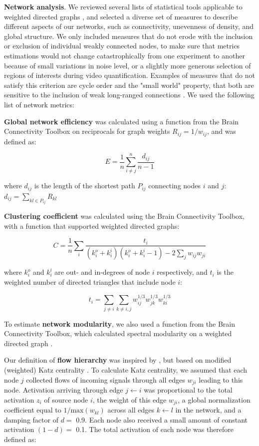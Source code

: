 \documentclass{article}
\begin{document}
\textbf{Network analysis}. We reviewed several lists of statistical tools applicable to weighted directed graphs \citep{rubinov2010toolbox,costa2007networks,hernandez2011metrics}, and selected a diverse set of measures to describe  different aspects of our networks, such as connectivity, unevenness of density, and global structure. We only included measures that do not erode with the inclusion or exclusion of individual weakly connected nodes, to make sure that metrics estimations would not change catastrophically from one experiment to another because of small variations in noise level, or a slightly more generous selection of regions of interests during video quantification. Examples of measures that do not satisfy this criterion are cycle order and the "small world" property, that both are sensitive to the inclusion of weak long-ranged connections \citep{papo2016beware}. We used the following list of network metrics:

\textbf{Global network efficiency} was calculated using a function from the Brain Connectivity Toolbox \citep{rubinov2010toolbox} on reciprocals for graph weights $R_{ij} = 1/w_{ij}$, and was defined as:

\[ E = \frac{1}{n} \sum_{i \neq j}^n{\frac{d_{ij}}{n-1}} \]

where $d_{ij}$ is the length of the shortest path $P_{ij}$ connecting nodes $i$ and $j$: $d_{ij} = \sum_{kl \in P_{ij}}{R_{kl}}$

\textbf{Clustering coefficient} \citep{fagiolo2007} was calculated using the Brain Connectivity Toolbox, with a function that supported weighted directed graphs:

\[ C = \frac{1}{n} \sum_i{\frac {t_i}{(k^o_i+k^i_i)(k^o_i+k^i_i-1)-2\sum_j{w_{ij}w_{ji}}}} \]

where $k^o_i$ and $k^i_i$ are out- and in-degrees of node $i$ respectively, and $t_i$ is the weighted number of directed triangles that include node $i$:

\[ t_i = \sum_{j \neq i}{\sum_{k \neq i,j}{w^{1/3}_{ij}w^{1/3}_{jk}w^{1/3}_{ki}}} \]

To estimate \textbf{network modularity}, we also used a function from the Brain Connectivity Toolbox, which calculated spectral modularity on a weighted directed graph \citep{reichardt2006community,leicht2008community}.

Our definition of \textbf{flow hierarchy} was inspired by \citep{mones2012hierarchy,czegel2015hierarchy}, but based on modified (weighted) Katz centrality \citep{katz1953original,fletcher2018katz}. To calculate Katz centrality, we assumed that each node $j$ collected flows of incoming signals through all edges $w_{ji}$ leading to this node. Activation arriving through edge $j\leftarrow i$ was proportional to the total activation $z_i$ of source node $i$, the weight of this edge $w_{ji}$, a global normalization coefficient equal to $1/\text{max}(w_{kl})$ across all edges $k\leftarrow l$ in the network, and a damping factor of $d=$ 0.9. Each node also received a small amount of constant activation $(1-d)=$ 0.1. The total activation of each node was therefore defined as:
\end{document}
